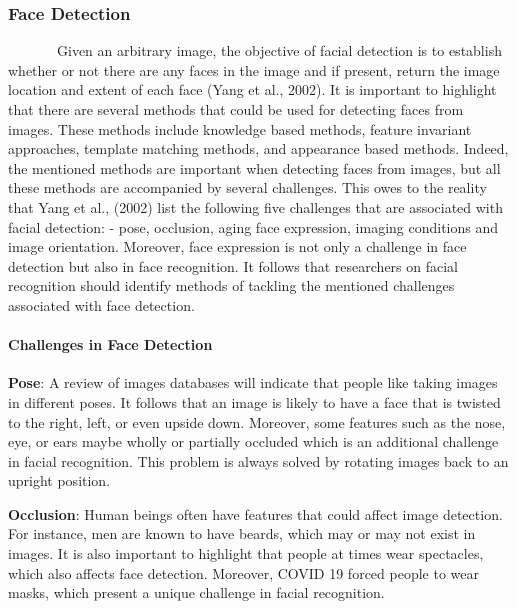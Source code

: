 \documentclass[
  12pt,
]{article}
\begin{document}
\subsubsection{Face Detection}\label{face-detection}

~~~~~~~Given an arbitrary image, the objective of facial detection is to
establish whether or not there are any faces in the image and if
present, return the image location and extent of each face (Yang et al.,
2002). It is important to highlight that there are several methods that
could be used for detecting faces from images. These methods include
knowledge based methods, feature invariant approaches, template matching
methods, and appearance based methods. Indeed, the mentioned methods are
important when detecting faces from images, but all these methods are
accompanied by several challenges. This owes to the reality that Yang et
al., (2002) list the following five challenges that are associated with
facial detection: - pose, occlusion, aging face expression, imaging
conditions and image orientation. Moreover, face expression is not only
a challenge in face detection but also in face recognition. It follows
that researchers on facial recognition should identify methods of
tackling the mentioned challenges associated with face detection.

\paragraph{\texorpdfstring{Challenges in Face Detection\\
}{Challenges in Face Detection }}\label{challenges-in-face-detection}

\textbf{Pose}: A review of images databases will indicate that people
like taking images in different poses. It follows that an image is
likely to have a face that is twisted to the right, left, or even upside
down. Moreover, some features such as the nose, eye, or ears maybe
wholly or partially occluded which is an additional challenge in facial
recognition. This problem is always solved by rotating images back to an
upright position.

\textbf{Occlusion}: Human beings often have features that could affect
image detection. For instance, men are known to have beards, which may
or may not exist in images. It is also important to highlight that
people at times wear spectacles, which also affects face detection.
Moreover, COVID 19 forced people to wear masks, which present a unique
challenge in facial recognition.
\end{document}
